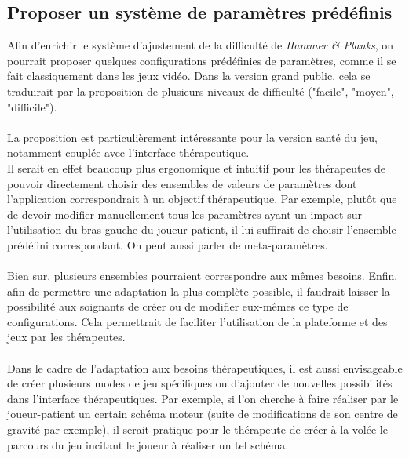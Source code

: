	\subsection{Proposer un système de paramètres prédéfinis}
Afin d'enrichir le système d'ajustement de la difficulté de \emph{Hammer \& Planks}, on pourrait proposer quelques configurations prédéfinies de paramètres, comme il se fait classiquement dans les jeux vidéo. Dans la version grand public, cela se traduirait par la proposition de plusieurs niveaux de difficulté ("facile", "moyen", "difficile").

\paragraph{}
La proposition est particulièrement intéressante pour la version santé du jeu, notamment couplée avec l'interface thérapeutique. \\
Il serait en effet beaucoup plus ergonomique et intuitif pour les thérapeutes de pouvoir directement choisir des ensembles de valeurs de paramètres dont l'application correspondrait à un objectif thérapeutique. Par exemple, plutôt que de devoir modifier manuellement tous les paramètres ayant un impact sur l'utilisation du bras gauche du joueur-patient, il lui suffirait de choisir l'ensemble prédéfini correspondant. On peut aussi parler de meta-paramètres.

\paragraph{} Bien sur, plusieurs ensembles pourraient correspondre aux mêmes besoins. Enfin, afin de permettre une adaptation la plus complète possible, il faudrait laisser la possibilité aux soignants de créer ou de modifier eux-mêmes ce type de configurations. Cela permettrait de faciliter l'utilisation de la plateforme et des jeux par les thérapeutes.

\paragraph{} Dans le cadre de l'adaptation aux besoins thérapeutiques, il est aussi envisageable de créer plusieurs modes de jeu spécifiques ou d'ajouter de nouvelles possibilités dans l'interface thérapeutiques. Par exemple, si l'on cherche à faire réaliser par le joueur-patient un certain schéma moteur (suite de modifications de son centre de gravité par exemple), il serait pratique pour le thérapeute de créer à la volée le parcours du jeu incitant le joueur à réaliser un tel schéma.


